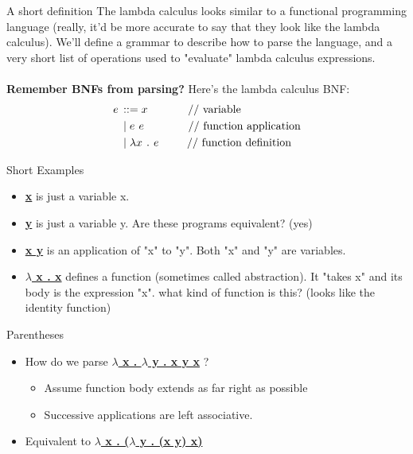 \documentclass[aspectratio=169]{beamer}
\begin{document}
\begin{frame}{A short definition}
    The lambda calculus looks similar to a functional programming language (really, it'd be more accurate to say that they look like the lambda calculus). We'll define a grammar to describe how to parse the language, and a very short list of operations used to "evaluate" lambda calculus expressions. \pause \\ \\
    \textbf{Remember BNFs from parsing?} Here's the lambda calculus BNF: \\
    \begin{align*}
        e \hspace{0.025in} &::= x \hspace{0.5in} \text{// variable} \\
        &\mid e \hspace{0.05in} e \hspace{0.55in} \text{// function application} \\
        &\mid \lambda x \hspace{0.05in} . \hspace{0.05in} e \hspace{0.35in} \text{// function definition} \\
    \end{align*}
\end{frame}

\begin{frame}{Short Examples}
    \begin{itemize}
        \item \underline{\textbf{x}} is just a variable x.
        \item \underline{\textbf{y}} is just a variable y. Are these programs equivalent? \pause (yes)
        \item \underline{\textbf{x y}} is an application of "x" to "y". Both "x" and "y" are variables. \pause
        \item \underline{\textbf{$\lambda$ x . x}} defines a function (sometimes called abstraction). It "takes x" and its body is the expression "x". what kind of function is this? \pause (looks like the identity function)
    \end{itemize}
\end{frame}

\begin{frame}{Parentheses}
    \begin{itemize}
        \item How do we parse \underline{\textbf{$\lambda$ x . $\lambda$ y . x y x}} ? \pause
        \begin{itemize}
            \item Assume function body extends as far right as possible
            \item Successive applications are left associative. \pause
        \end{itemize}
        \item Equivalent to \underline{\textbf{$\lambda$ x . ($\lambda$ y . (x y) x)}}
    \end{itemize}
\end{frame}
\end{document}
